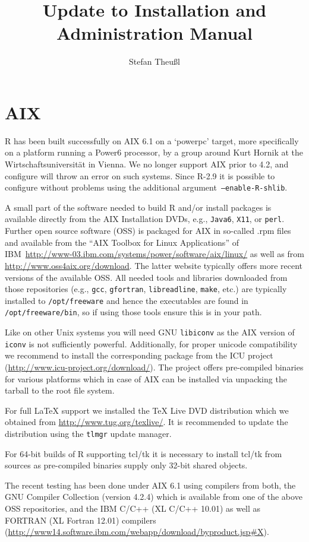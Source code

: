 \documentclass[a4paper]{report}
\author{Stefan Theu\ss{}l}
\title{Update to \proglang{R} Installation and Administration Manual}
\newcommand{\code}[1]{\mbox{\texttt{#1}}}
\newcommand{\proglang}[1]{\textsf{#1}}
\begin{document}
\appendix
\section{AIX}

\proglang{R} has been built successfully on AIX 6.1 on a `powerpc'
target, more specifically on a platform running a Power6 processor, by
a group around Kurt Hornik at the Wirtschaftsuniversit\"at in
Vienna. We no longer support AIX prior to 4.2, and configure will
throw an error on such systems. Since \proglang{R}-2.9 it is possible
to configure without problems using the additional
argument~\code{--enable-R-shlib}.

A small part of the software needed to build \proglang{R} and/or
install packages 
is available directly from the AIX Installation DVDs, e.g., \code{Java6},
\code{X11}, or \code{perl}. Further open source software (OSS) is
packaged for AIX in so-called .rpm files and available from
the ``AIX Toolbox for Linux Applications'' of
IBM~\url{http://www-03.ibm.com/systems/power/software/aix/linux/} as
well as from \url{http://www.oss4aix.org/download}. The latter website
typically offers more recent versions of the available OSS. All needed
tools and libraries downloaded from those repositories (e.g.,
\code{gcc}, \code{gfortran}, \code{libreadline}, \code{make}, etc.)
are typically installed to \code{/opt/freeware} and hence the
executables are found in \code{/opt/freeware/bin}, so if using those
tools ensure this is in your path.

Like on other Unix systems you will need GNU \code{libiconv} as the
AIX version of \code{iconv} is not sufficiently powerful.
Additionally, for proper unicode compatibility we recommend to install
the corresponding package from the ICU project
(\url{http://www.icu-project.org/download/}). The project
offers pre-compiled binaries for various platforms which in case of
AIX can be installed via unpacking the tarball to the root file
system. 

For full \LaTeX{} support we installed the \TeX{} Live DVD distribution which
we obtained from \url{http://www.tug.org/texlive/}. It is recommended
to update the distribution using the \code{tlmgr} update
manager.

For 64-bit builds of \proglang{R} supporting tcl/tk it is necessary to
install tcl/tk from sources as pre-compiled binaries supply only 32-bit
shared objects.

The recent testing has been done under AIX 6.1 using
compilers from both, the GNU Compiler Collection (version 4.2.4) which is
available from one of the above OSS repositories, and the IBM C/C++ (XL
C/C++ 10.01) as well as FORTRAN (XL Fortran 12.01) compilers
(\url{http://www14.software.ibm.com/webapp/download/byproduct.jsp#X}).
\end{document}
